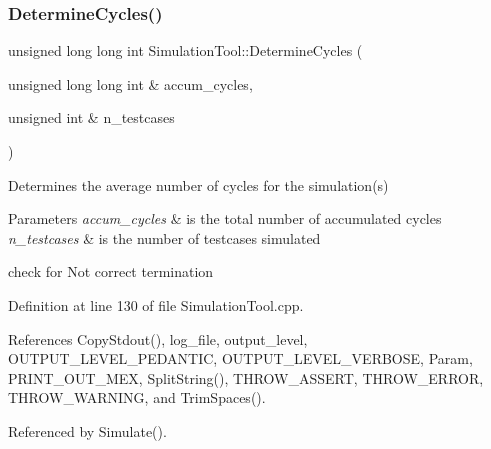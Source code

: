\subsubsection{\texorpdfstring{Determine\+Cycles()}{DetermineCycles()}}
{\footnotesize\ttfamily unsigned long long int Simulation\+Tool\+::\+Determine\+Cycles (\begin{DoxyParamCaption}\item[{unsigned long long int \&}]{accum\+\_\+cycles,  }\item[{unsigned int \&}]{n\+\_\+testcases }\end{DoxyParamCaption})}



Determines the average number of cycles for the simulation(s) 


\begin{DoxyParams}{Parameters}
{\em accum\+\_\+cycles} & is the total number of accumulated cycles \\
\hline
{\em n\+\_\+testcases} & is the number of testcases simulated \\
\hline
\end{DoxyParams}
check for Not correct termination 

Definition at line 130 of file Simulation\+Tool.\+cpp.



References Copy\+Stdout(), log\+\_\+file, output\+\_\+level, O\+U\+T\+P\+U\+T\+\_\+\+L\+E\+V\+E\+L\+\_\+\+P\+E\+D\+A\+N\+T\+IC, O\+U\+T\+P\+U\+T\+\_\+\+L\+E\+V\+E\+L\+\_\+\+V\+E\+R\+B\+O\+SE, Param, P\+R\+I\+N\+T\+\_\+\+O\+U\+T\+\_\+\+M\+EX, Split\+String(), T\+H\+R\+O\+W\+\_\+\+A\+S\+S\+E\+RT, T\+H\+R\+O\+W\+\_\+\+E\+R\+R\+OR, T\+H\+R\+O\+W\+\_\+\+W\+A\+R\+N\+I\+NG, and Trim\+Spaces().



Referenced by Simulate().

